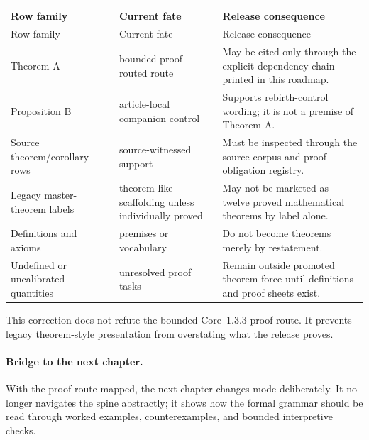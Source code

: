 \begin{longtable}{@{}p{}p{}p{}@{}}
\toprule
Row family & Current fate & Release consequence \\
\midrule
\endfirsthead
\toprule
Row family & Current fate & Release consequence \\
\midrule
\endhead
Theorem A & bounded proof-routed route & May be cited only through the explicit dependency chain printed in this roadmap. \\
Proposition B & article-local companion control & Supports rebirth-control wording; it is not a premise of Theorem A. \\
Source theorem/corollary rows & source-witnessed support & Must be inspected through the source corpus and proof-obligation registry. \\
Legacy master-theorem labels & theorem-like scaffolding unless individually proved & May not be marketed as twelve proved mathematical theorems by label alone. \\
Definitions and axioms & premises or vocabulary & Do not become theorems merely by restatement. \\
Undefined or uncalibrated quantities & unresolved proof tasks & Remain outside promoted theorem force until definitions and proof sheets exist. \\
\bottomrule
\end{longtable}

This correction does not refute the bounded Core~1.3.3 proof route. It prevents
legacy theorem-style presentation from overstating what the release proves.

\paragraph{Bridge to the next chapter.}
With the proof route mapped, the next chapter changes mode deliberately. It no
longer navigates the spine abstractly; it shows how the formal grammar should
be read through worked examples, counterexamples, and bounded interpretive
checks.

\clearpage
